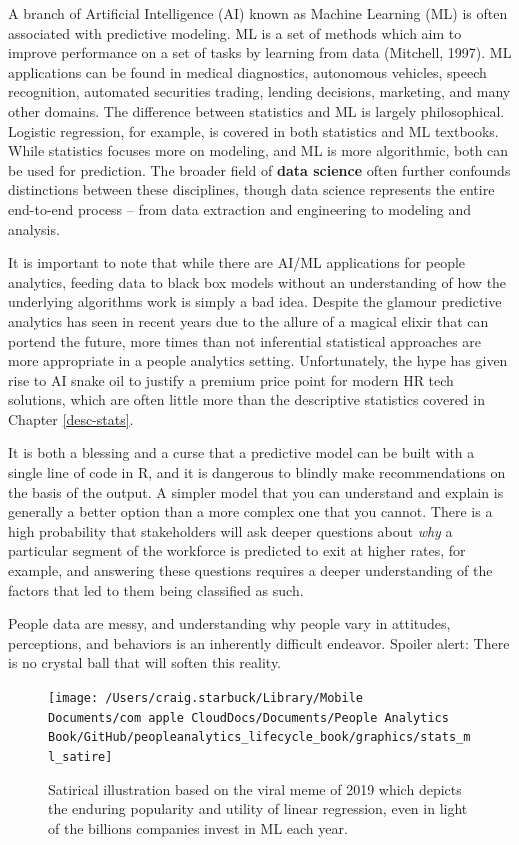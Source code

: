 \documentclass[
]{book}
\begin{document}
A branch of Artificial Intelligence (AI) known as Machine Learning (ML) is often associated with predictive modeling. ML is a set of methods which aim to improve performance on a set of tasks by learning from data (Mitchell, 1997). ML applications can be found in medical diagnostics, autonomous vehicles, speech recognition, automated securities trading, lending decisions, marketing, and many other domains. The difference between statistics and ML is largely philosophical. Logistic regression, for example, is covered in both statistics and ML textbooks. While statistics focuses more on modeling, and ML is more algorithmic, both can be used for prediction. The broader field of \textbf{data science} often further confounds distinctions between these disciplines, though data science represents the entire end-to-end process -- from data extraction and engineering to modeling and analysis.

It is important to note that while there are AI/ML applications for people analytics, feeding data to black box models without an understanding of how the underlying algorithms work is simply a bad idea. Despite the glamour predictive analytics has seen in recent years due to the allure of a magical elixir that can portend the future, more times than not inferential statistical approaches are more appropriate in a people analytics setting. Unfortunately, the hype has given rise to AI snake oil to justify a premium price point for modern HR tech solutions, which are often little more than the descriptive statistics covered in Chapter \ref{desc-stats}.

It is both a blessing and a curse that a predictive model can be built with a single line of code in R, and it is dangerous to blindly make recommendations on the basis of the output. A simpler model that you can understand and explain is generally a better option than a more complex one that you cannot. There is a high probability that stakeholders will ask deeper questions about \emph{why} a particular segment of the workforce is predicted to exit at higher rates, for example, and answering these questions requires a deeper understanding of the factors that led to them being classified as such.

People data are messy, and understanding why people vary in attitudes, perceptions, and behaviors is an inherently difficult endeavor. Spoiler alert: There is no crystal ball that will soften this reality.

\begin{figure}

{\centering \texttt{[image: /Users/craig.starbuck/Library/Mobile Documents/com~apple~CloudDocs/Documents/People Analytics Book/GitHub/peopleanalytics\_lifecycle\_book/graphics/stats\_ml\_satire]} 

}

\caption{Satirical illustration based on the viral meme of 2019 which depicts the enduring popularity and utility of linear regression, even in light of the billions companies invest in ML each year.}\label{fig:stats-ml-satire}
\end{figure}
\end{document}
